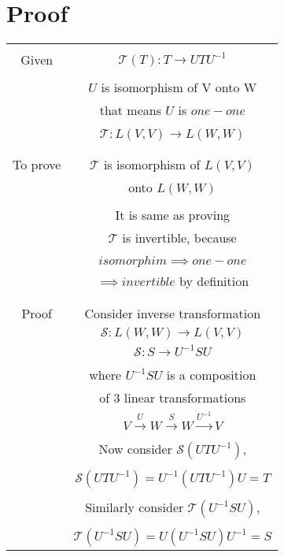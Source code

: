 \documentclass[journal,12pt,twocolumn]{IEEEtran}
\begin{document}
\section{Proof}
\begin{table}[h]
\begin{center}
\begin{tabular}{|c|c|}
\hline
& \\
Given & $\mathcal{T}(T): T \rightarrow UTU^{-1}$\\
& \\
& $U$ is isomorphism of V onto W\\
& that means $U$ is $one-one$\\
& \\
& $\mathcal{T}: L(V,V) \rightarrow L(W,W)$\\
& \\
\hline
&\\
To prove & $\mathcal{T}$ is isomorphism of $L(V,V)$\\
&  onto $L(W,W)$\\
& \\
& It is same as proving\\
& $\mathcal{T}$ is invertible, because \\
& \\
& $isomorphim \implies one-one$\\
& $\implies invertible$ by definition\\
& \\
\hline
& \\
Proof & Consider inverse transformation\\
& $\mathcal{S}: L(W,W) \rightarrow L(V,V)$\\
& $\mathcal{S}: S \rightarrow U^{-1}SU$\\
& \\
& where $U^{-1}SU$ is a composition\\ 
& of 3 linear transformations\\
& $V \xrightarrow{U} W \xrightarrow{S} W \xrightarrow{U^{-1}} V$\\
& \\
& Now consider $\mathcal{S}(UTU^{-1})$,\\
& \\
& $\mathcal{S}(UTU^{-1}) = U^{-1}(UTU^{-1})U = T$\\
& \\
& Similarly consider $\mathcal{T}(U^{-1}SU)$,\\
& \\
& $\mathcal{T}(U^{-1}SU) = U(U^{-1}SU)U^{-1} = S$\\

\end{tabular}
\end{center}
\end{table}
\end{document}
